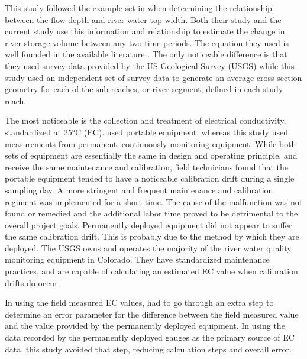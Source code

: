 This study followed the example set in \citet{Mueller2008} when determining the relationship between the flow depth and river water top width.  Both their study and the current study use this information and relationship to estimate the change in river storage volume between any two time periods.  The equation they used is well founded in the available literature \citep{Gates1996, Buhman2002}.  The only noticeable difference is that they used survey data provided by the US Geological Survey (USGS) while this study used an independent set of survey data to generate an average cross section geometry for each of the sub-reaches, or river segment, defined in each study reach.

The most noticeable is the collection and treatment of electrical conductivity, standardized at \ang{25}C (EC).  \citep{Mueller2008} used portable equipment, whereas this study used measurements from permanent, continuously monitoring equipment.  While both sets of equipment are essentially the same in design and operating principle, and receive the same maintenance and calibration, field technicians found that the portable equipment tended to have a noticeable calibration drift during a single sampling day.  A more stringent and frequent maintenance and calibration regiment was implemented for a short time.  The cause of the malfunction was not found or remedied and the additional labor time proved to be detrimental to the overall project goals.  Permanently deployed equipment did not appear to suffer the same calibration drift.  This is probably due to the method by which they are deployed.  The USGS owns and operates the majority of the river water quality monitoring equipment in Colorado.  They have standardized maintenance practices, and are capable of calculating an estimated EC value when calibration drifts do occur.

In using the field measured EC values, \citeauthor{Mueller2008} had to go through an extra step to determine an error parameter for the difference between the field measured value and the value provided by the permanently deployed equipment.  In using the data recorded by the permanently deployed gauges as the primary source of EC data, this study avoided that step, reducing calculation steps and overall error. 

